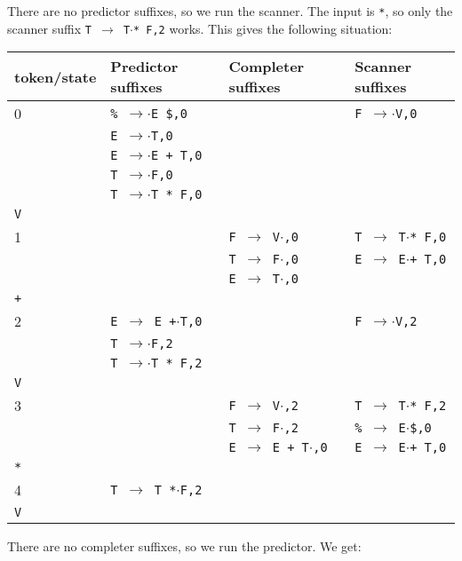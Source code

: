 \documentclass[11pt]{article}
\def\ra{\rightarrow}
\begin{document}
There are no predictor suffixes, so we run the scanner.  The input is
\texttt{*}, so only the scanner suffix \texttt{T $\ra$ T$\cdot$* F,2}
works.  This gives the following situation:

\begin{tabular}{|l|l|l|l|}
\hline
token/state & Predictor suffixes & Completer suffixes & Scanner suffixes\\
\hline
0     & \texttt{\% $\ra$$\cdot$E \$,0} & & \texttt{F $\ra$$\cdot$V,0}\\
      & \texttt{E $\ra$$\cdot$T,0} & & \\
      & \texttt{E $\ra$$\cdot$E + T,0} & & \\
      & \texttt{T $\ra$$\cdot$F,0} & & \\
      & \texttt{T $\ra$$\cdot$T * F,0} & & \\
\hline
\texttt{V} &  & &\\
\hline
1     &  & \texttt{F $\ra$ V$\cdot$,0}& \texttt{T $\ra$ T$\cdot$* F,0} \\
      &  & \texttt{T $\ra$ F$\cdot$,0}& \texttt{E $\ra$ E$\cdot$+ T,0} \\
      &  & \texttt{E $\ra$ T$\cdot$,0}& \\
\hline
\texttt{+} &  & &\\
\hline
2     & \texttt{E $\ra$ E +$\cdot$T,0} & & \texttt{F $\ra$$\cdot$V,2}\\
      & \texttt{T $\ra$$\cdot$F,2} & & \\
      & \texttt{T $\ra$$\cdot$T * F,2} & & \\
\hline 
\texttt{V} & & &\\
\hline
3     &  &  \texttt{F $\ra$ V$\cdot$,2}& \texttt{T $\ra$ T$\cdot$* F,2}\\
      &  &  \texttt{T $\ra$ F$\cdot$,2}& \texttt{\% $\ra$ E$\cdot$\$,0}\\
      &  &  \texttt{E $\ra$ E + T$\cdot$,0}& \texttt{E $\ra$ E$\cdot$+ T,0}\\
\hline
\texttt{*} & & & \\
\hline
4     & \texttt{T $\ra$ T *$\cdot$F,2} & & \\
\hline
\texttt{V} &  & &\\
\hline
\end{tabular}

There are no completer suffixes, so we run the predictor.  We get:
\end{document}
